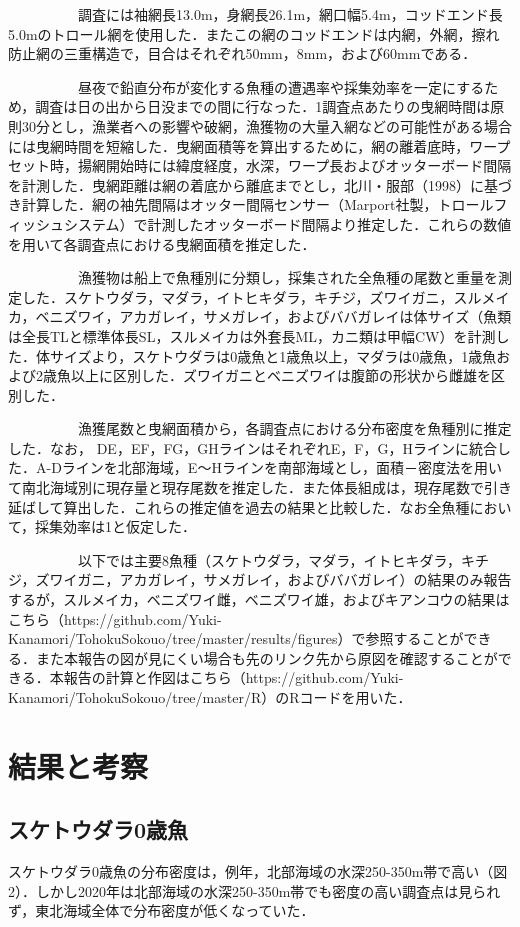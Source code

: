 \documentclass[11pt]{article} %
\begin{document}
\begin{linenumbers}
\ \ \ \ \ \ \ \ \ \ 
調査には袖網長13.0m，身網長26.1m，網口幅5.4m，コッドエンド長5.0mのトロール網を使用した．またこの網のコッドエンドは内網，外網，擦れ防止網の三重構造で，目合はそれぞれ50mm，8mm，および60mmである．

\ \ \ \ \ \ \ \ \ \ 
昼夜で鉛直分布が変化する魚種の遭遇率や採集効率を一定にするため，調査は日の出から日没までの間に行なった．1調査点あたりの曳網時間は原則30分とし，漁業者への影響や破網，漁獲物の大量入網などの可能性がある場合には曳網時間を短縮した．曳網面積等を算出するために，網の離着底時，ワープセット時，揚網開始時には緯度経度，水深，ワープ長およびオッターボード間隔を計測した．曳網距離は網の着底から離底までとし，北川・服部（1998）に基づき計算した．網の袖先間隔はオッター間隔センサー（Marport社製，トロールフィッシュシステム）で計測したオッターボード間隔より推定した．これらの数値を用いて各調査点における曳網面積を推定した．

\ \ \ \ \ \ \ \ \ \ 
漁獲物は船上で魚種別に分類し，採集された全魚種の尾数と重量を測定した．スケトウダラ，マダラ，イトヒキダラ，キチジ，ズワイガニ，スルメイカ，ベニズワイ，アカガレイ，サメガレイ，およびババガレイは体サイズ（魚類は全長TLと標準体長SL，スルメイカは外套長ML，カニ類は甲幅CW）を計測した．体サイズより，スケトウダラは0歳魚と1歳魚以上，マダラは0歳魚，1歳魚および2歳魚以上に区別した．ズワイガニとベニズワイは腹節の形状から雌雄を区別した．

\ \ \ \ \ \ \ \ \ \ 
漁獲尾数と曳網面積から，各調査点における分布密度を魚種別に推定した．なお， DE，EF，FG，GHラインはそれぞれE，F，G，Hラインに統合した．A-Dラインを北部海域，E～Hラインを南部海域とし，面積－密度法を用いて南北海域別に現存量と現存尾数を推定した．また体長組成は，現存尾数で引き延ばして算出した．これらの推定値を過去の結果と比較した．なお全魚種において，採集効率は1と仮定した．

\ \ \ \ \ \ \ \ \ \ 
以下では主要8魚種（スケトウダラ，マダラ，イトヒキダラ，キチジ，ズワイガニ，アカガレイ，サメガレイ，およびババガレイ）の結果のみ報告するが，スルメイカ，ベニズワイ雌，ベニズワイ雄，およびキアンコウの結果はこちら（https://github.com/Yuki-Kanamori/TohokuSokouo/tree/master/results/figures）で参照することができる．また本報告の図が見にくい場合も先のリンク先から原図を確認することができる．本報告の計算と作図はこちら（https://github.com/Yuki-Kanamori/TohokuSokouo/tree/master/R）のRコードを用いた．

\section{結果と考察}
\subsection{スケトウダラ0歳魚}
スケトウダラ0歳魚の分布密度は，例年，北部海域の水深250-350m帯で高い（図2）．しかし2020年は北部海域の水深250-350m帯でも密度の高い調査点は見られず，東北海域全体で分布密度が低くなっていた．


\end{linenumbers}
\end{document}
